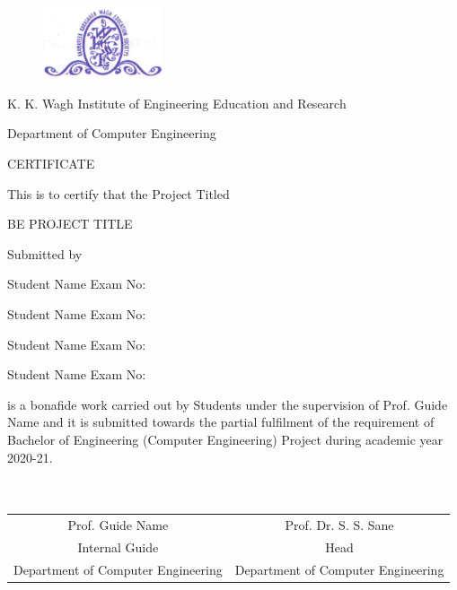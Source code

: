 \documentclass[oneside,a4paper,12pt]{report}
\begin{document}
\newpage



\begin{figure}[ht]
\centering
\includegraphics[width=100pt]{collegelogo.png}
\end{figure}


{\bfseries \fontsize{14}{12} \selectfont \centerline{K. K. Wagh Institute of Engineering Education and Research}
\centerline{Department of Computer Engineering}
\vspace*{3\baselineskip}} 


{\bfseries \fontsize{16}{12} \selectfont \centerline{CERTIFICATE} 
\vspace*{3\baselineskip}} 

\centerline{This is to certify that the Project Titled}
\vspace*{1\baselineskip} 


{\bfseries \fontsize{14}{12} \selectfont \centerline{BE PROJECT TITLE}
\vspace*{1\baselineskip}}

\centerline{Submitted by}
\vspace*{1\baselineskip} 
\centerline{Student Name  \hspace{25 mm} Exam No: } 
\centerline{Student Name \hspace{25 mm} Exam No:  } 
\centerline{Student Name \hspace{25 mm} Exam No: }
\centerline{Student Name \hspace{25 mm} Exam No: }
\vspace*{1\baselineskip} 
is a bonafide work carried out by Students under the supervision of Prof. Guide Name and it
is submitted towards the partial fulfilment of the requirement of Bachelor of Engineering (Computer Engineering) Project during academic year 2020-21.\\\\\\

\bgroup
\def\arraystretch{0.7}
\begin{tabular}{c c }
Prof. Guide Name &  \hspace{25 mm} Prof. Dr. S. S. Sane \\								
Internal Guide   &  \hspace{25 mm} Head \\
Department of Computer Engineering  &	\hspace{25 mm}Department of Computer Engineering  \\
\end{tabular}
\end{document}
